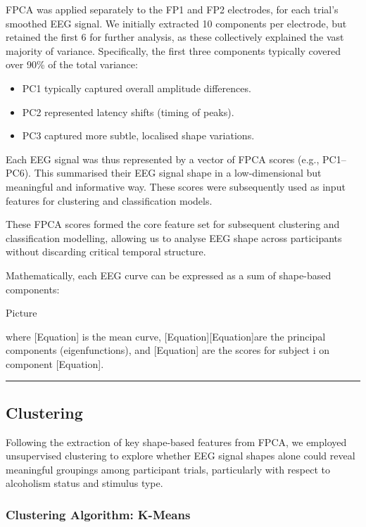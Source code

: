 \documentclass{article}
\begin{document}
FPCA was applied separately to the FP1 and FP2 electrodes, for each
trial's smoothed EEG signal. We initially extracted 10 components per
electrode, but retained the first 6 for further analysis, as these
collectively explained the vast majority of variance. Specifically, the
first three components typically covered over 90\% of the total
variance:

\begin{itemize}
\item
  PC1 typically captured overall amplitude differences.
\item
  PC2 represented latency shifts (timing of peaks).
\item
  PC3 captured more subtle, localised shape variations.
\end{itemize}

Each EEG signal was thus represented by a vector of FPCA scores (e.g.,
PC1--PC6). This summarised their EEG signal shape in a low-dimensional
but meaningful and informative way. These scores were subsequently used
as input features for clustering and classification models.

These FPCA scores formed the core feature set for subsequent clustering
and classification modelling, allowing us to analyse EEG shape across
participants without discarding critical temporal structure.

Mathematically, each EEG curve can be expressed as a sum of shape-based
components:

Picture

where {[}Equation{]} is the mean curve, {[}Equation{]}{[}Equation{]}are
the principal components (eigenfunctions), and {[}Equation{]} are the
scores for subject i on component {[}Equation{]}.

\begin{center}\rule{0.5\linewidth}{0.5pt}\end{center}

\subsection{Clustering}\label{clustering}

Following the extraction of key shape-based features from FPCA, we
employed unsupervised clustering to explore whether EEG signal shapes
alone could reveal meaningful groupings among participant trials,
particularly with respect to alcoholism status and stimulus type.

\subsubsection{Clustering Algorithm:
K-Means}\label{clustering-algorithm-k-means}
\end{document}
